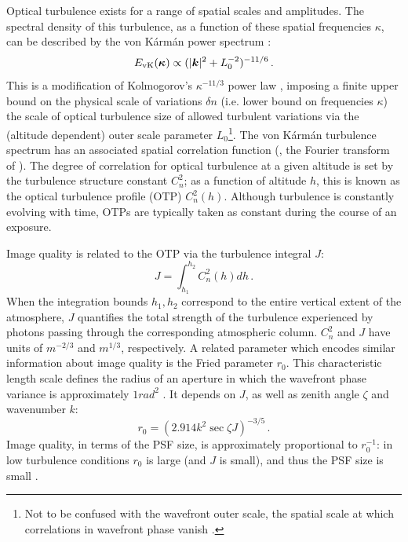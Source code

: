 \documentclass[twocolumn]{aastex631}
\newcommand{\vk}{von K\'arm\'an\xspace}
\begin{document}
Optical turbulence exists for a range of spatial scales and amplitudes.
The spectral density of this turbulence, as a function of these spatial frequencies $\kappa$, can be described by the \vk power spectrum \citep{von_karman_progress_1948, tokovinin_wavefront_1998}:
\begin{equation}\label{eqn:vk}
    E_{\rm vK}(\vect{\kappa}) \propto ( \lvert \vect{k} \rvert^2 + L_0^{-2})^{-11/6} \,.
\end{equation}
This is a modification of Kolmogorov's $\kappa^{-11/3}$ power law \citep{kolmogorov_local_1941}, imposing a finite upper bound on the physical scale of variations $\delta n$ (i.e. lower bound on frequencies $\kappa$) the scale of optical turbulence  size of allowed turbulent variations via the (altitude dependent) outer scale parameter $L_0$\footnote{Not to be confused with the wavefront outer scale, the spatial scale at which correlations in wavefront phase vanish \citep{tokovinin_wavefront_1998, borgnino_estimation_1990}.}. 
The \vk turbulence spectrum has an associated spatial correlation function (\ie, the Fourier transform of ). 
The degree of correlation for optical turbulence at a given altitude is set by the turbulence structure constant $C_n^2$; as a function of altitude $h$, this is known as the optical turbulence profile (OTP) $C_n^2(h)$. 
Although turbulence is constantly evolving with time, OTPs are typically taken as constant during the course of an exposure.

Image quality is related to the OTP via the turbulence integral $J$:
\begin{equation} \label{eqn:j}
	J = \int_{h_1}^{h_2} C_n^2(h) dh \,.
\end{equation}
When the integration bounds $h_1, h_2$ correspond to the entire vertical extent of the atmosphere, $J$ quantifies the total strength of the turbulence experienced by photons passing through the corresponding atmospheric column.
$C_n^2$ and $J$ have units of $\unit{m^{-2/3}}$ and $\unit{m^{1/3}}$, respectively. 
A related parameter which encodes similar information about image quality is the Fried parameter $r_0$.
This characteristic length scale defines the radius of an aperture in which the wavefront phase variance is approximately $ 1\unit{rad^2}$ \citep{fried_statistics_1965}. It depends on $J$, as well as zenith angle $\zeta$ and wavenumber $k$:
\begin{equation} \label{eqn:r0}
	r_0 = (2.914 k^2 \sec \zeta J )^{-3/5}\,.
\end{equation}
Image quality, in terms of the PSF size, is approximately proportional to $r_0^{-1}$: in low turbulence conditions $r_0$ is large (and $J$ is small), and thus the PSF size is small \citep{roddier_v_1981}. 
\end{document}
